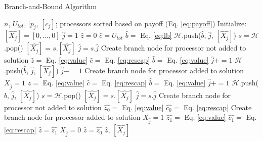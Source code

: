 \documentclass{article}
\begin{document}
    \begin{algorithm} 
      \caption{Branch-and-Bound Algorithm} \label{alg:bab}
      \footnotesize
      \begin{algorithmic}[1]
        \REQUIRE $n$, $U_{tot}$, $[p_{j}$, $[c_{j}]$; processors sorted based on payoff (Eq. \ref{eq:payoff})
        \STATE Initialize:
        \STATE $[\hat{X_{j}}] = [0, ..., 0]$
        \STATE $\hat{j} = 1$
        \STATE $\hat{z} = 0$
        \STATE $\hat{c} = U_{tot}$
        \STATE $\hat{b} =$ Eq. \ref{eq:lb}
        \STATE $\mathcal{H}$.push($\hat{b}$, $\hat{j}$, $[\hat{X_{j}}]$)
          \STATE $s = \mathcal{H}$.pop()
          \STATE $[\hat{X_j}] = s.[\hat{X_j}]$
          \STATE $\hat{j} = s.\hat{j}$
          \STATE Create branch node for processor not added to solution
          \STATE $\hat{z} =$ Eq. \ref{eq:value}
          \STATE $\hat{c} =$ Eq. \ref{eq:rescap}
          \STATE $\hat{b} =$ Eq. \ref{eq:value}
          \STATE $\hat{j} += 1$
            \STATE $\mathcal{H}$.push($\hat{b}$, $\hat{j}$, $[\hat{X_{j}}]$)
          \ENDIF
          \STATE $\hat{j} -= 1$
          \STATE Create branch node for processor added to solution
          \STATE $X_{\hat{j}} = 1$
          \STATE $\hat{z} =$ Eq. \ref{eq:value}
          \STATE $\hat{c} =$ Eq. \ref{eq:rescap}
          \STATE $\hat{b} =$ Eq. \ref{eq:value}
          \STATE $\hat{j} += 1$
            \STATE $\mathcal{H}$.push($\hat{b}$, $\hat{j}$, $[\hat{X_{j}}]$)
          \ENDIF
        \ENDWHILE
        \STATE $s = \mathcal{H}$.pop()
        \STATE $[\hat{X_j}] = s.[\hat{X_j}]$
        \STATE $\hat{j} = s.\hat{j}$
        \STATE Create branch node for processor not added to solution
        \STATE $\hat{z_{0}} =$ Eq. \ref{eq:value}
        \STATE $\hat{c_{0}} =$ Eq. \ref{eq:rescap}
        \STATE Create branch node for processor added to solution
        \STATE $X_{\hat{j}} = 1$
        \STATE $\hat{z_{1}} =$ Eq. \ref{eq:value}
        \STATE $\hat{c_{1}} =$ Eq. \ref{eq:rescap}
          \STATE $\hat{z} = \hat{z_{1}}$
        \ELSE
          \STATE $X_{\hat{j}} = 0$
          \STATE $\hat{z} = \hat{z_{0}}$
        \ENDIF
        \RETURN $\hat{z}$, $[\hat{X_{j}}]$
      \end{algorithmic}
    \end{algorithm}

  
\end{document}
